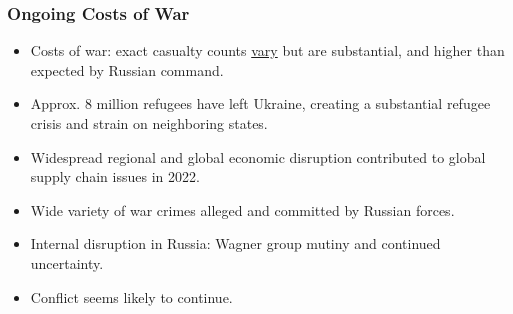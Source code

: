 \documentclass{beamer}
\begin{document}
\begin{frame} 
	\frametitle{\LARGE{Ongoing Costs of War}}
	\begin{itemize}
		\item Costs of war: exact casualty counts \href{https://en.wikipedia.org/wiki/Russian_invasion_of_Ukraine\#Casualties}{vary} but are substantial, and higher than expected by Russian command. \pause
		\item Approx. 8 million refugees have left Ukraine, creating a substantial refugee crisis and strain on neighboring states. \pause
		\item Widespread regional and global economic disruption contributed to global supply chain issues in 2022. \pause
		\item Wide variety of war crimes alleged and committed by Russian forces. \pause
		\item Internal disruption in Russia: Wagner group mutiny and continued uncertainty. \pause
		\item Conflict seems likely to continue.
	\end{itemize}
\end{frame}
\end{document}
